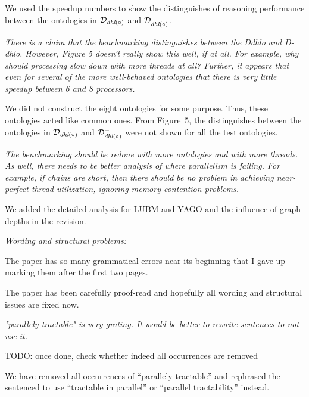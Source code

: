 \documentclass{article}
\let\quoteOld\quote
\let\endquoteOld\endquote
\renewenvironment{quote}{\quoteOld\itshape}{\endquoteOld}
\begin{document}
We used the speedup numbers to show the distinguishes of reasoning performance between the ontologies in $\mathcal{D}_{\textit{\text{dhl}}(\circ)}$ and
$\mathcal{D}^-_{\textit{\text{dhl}}(\circ)}$.


\begin{quote}
There is a claim that the benchmarking distinguishes between the Ddhlo and
D-dhlo.  However, Figure 5 doesn't really show this well, if at all.   For
example, why should processing slow down with more threads at all?  Further,
it appears that even for several of the more well-behaved ontologies that there
is very little speedup between 6 and 8 processors.
\end{quote}


We did not
construct the eight ontologies for some purpose.
Thus, these ontologies acted like common ones.
From Figure~5, the distinguishes between the ontologies in
$\mathcal{D}_{\textit{\text{dhl}}(\circ)}$ and
$\mathcal{D}^-_{\textit{\text{dhl}}(\circ)}$ were not shown
for all the test ontologies.


\begin{quote}
The benchmarking should be redone with more ontologies and with more
threads.  As well, there needs to be better analysis of where parallelism is
failing.  For example, if chains are short, then there should be no problem
in achieving near-perfect thread utilization, ignoring memory contention
problems.
\end{quote}


We added the detailed analysis for LUBM and YAGO and the influence of
graph depths in the revision.


\begin{quote}
Wording and structural problems:

The paper has so many grammatical errors near its beginning that I gave up
marking them after the first two pages.
\end{quote}

The paper has been carefully proof-read and hopefully all wording and structural issues are fixed now.

\begin{quote}
"parallely tractable" is very grating.  It would be better to rewrite
sentences to not use it.
\end{quote}

TODO: once done, check whether indeed all occurrences are removed

We have removed all occurrences of ``parallely tractable'' and
rephrased the sentenced to use ``tractable in parallel'' or ``parallel
tractability'' instead.
\end{document}
